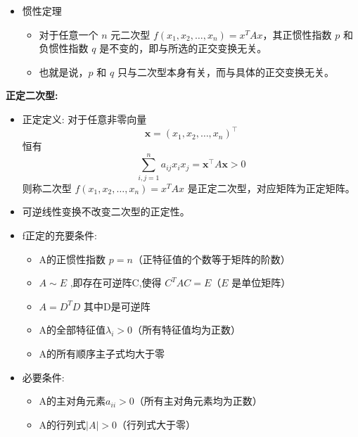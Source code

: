 \documentclass[10pt]{article}
\begin{document}
\begin{multicols}{2}
\begin{itemize}
  \item 惯性定理
    \begin{itemize}
      \item 对于任意一个 \(n\) 元二次型 \(f(x_1, x_2, \ldots, x_n) = x^{T} A x\)，其正惯性指数 \(p\) 和负惯性指数 \(q\) 是不变的，即与所选的正交变换无关。
      \item 也就是说，\(p\) 和 \(q\) 只与二次型本身有关，而与具体的正交变换无关。
    \end{itemize}
\end{itemize}

\textbf{正定二次型:}
  \begin{itemize}
    \item 正定定义: 对于任意非零向量  
      \[
      \mathbf{x} = (x_1, x_2, \ldots, x_n)^\top
      \]  
      恒有  
      \[
      \sum_{i,j=1}^{n} a_{ij} x_i x_j = \mathbf{x}^\top A \mathbf{x} > 0
      \]
      则称二次型 \(f(x_1, x_2, \ldots, x_n) = x^{T} A x\) 是正定二次型，对应矩阵为正定矩阵。

    \item 可逆线性变换不改变二次型的正定性。

    \item f正定的充要条件:
      \begin{itemize}
        \item A的正惯性指数 \(p = n\)（正特征值的个数等于矩阵的阶数）
        \item \( A \sim E \) ,即存在可逆阵C,使得 \( C^{T} A C = E \)（\(E\) 是单位矩阵）
        \item \( A = D^{T} D \) 其中D是可逆阵
        \item A的全部特征值\( \lambda_i > 0 \)（所有特征值均为正数）
        \item A的所有顺序主子式均大于零
      \end{itemize}
    \item 必要条件:
      \begin{itemize}
        \item A的主对角元素\(a_{ii} > 0\)（所有主对角元素均为正数）
        \item A的行列式\( |A| > 0 \)（行列式大于零）
      \end{itemize}
  \end{itemize}

\end{multicols}
\end{document}
